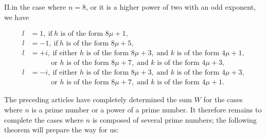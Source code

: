 
II.\quad in the case where $n=8$, or it is a higher power of two with an odd exponent, we have

\[
\begin{aligned}
l&=1,\ \text{if}\  h\text{ is of the form }8\mu+1,\\
l&=-1,\ \text{if}\  h\text{ is of the form }8\mu+5,\\
l&=+i,\ \text{if either }h\text{ is of the form }8\mu+3,\;\text{and }k\text{ is of the form }4\mu+1,\\
&\phantom{=+i,}\text{or }h\text{ is of the form }8\mu+7,\;\text{and }k\text{ is of the form }4\mu+3,\\
l&=-i,\ \text{if either }h\text{ is of the form }8\mu+3,\;\text{and }k\text{ is of the form }4\mu+3,\\
&\phantom{=+i,}\text{or }h\text{ is of the form }8\mu+7,\;\text{and }k\text{ is of the form }4\mu+1.
\end{aligned}
\]

The preceding articles have completely determined the sum $W$ for the cases where $n$ is a prime number or a power of a prime number. It therefore remains to complete the cases where $n$ is composed of several prime numbers; the following theorem will prepare the way for us:
